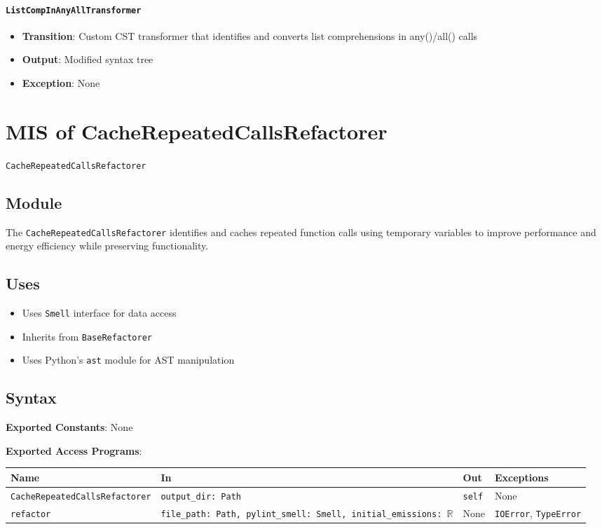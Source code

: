 \documentclass[12pt, titlepage]{article}
\begin{document}
\paragraph{\texttt{ListCompInAnyAllTransformer}}
\begin{itemize}
\item \textbf{Transition}: Custom CST transformer that identifies and converts list comprehensions in any()/all() calls
\item \textbf{Output}: Modified syntax tree
\item \textbf{Exception}: None
\end{itemize}

\newpage

\section{MIS of CacheRepeatedCallsRefactorer} \label{mis:CacheCalls}

\texttt{CacheRepeatedCallsRefactorer}

\subsection{Module}
The \texttt{CacheRepeatedCallsRefactorer} identifies and caches repeated function calls using temporary variables to improve performance and energy efficiency while preserving functionality.

\subsection{Uses}
\begin{itemize}
\item Uses \texttt{Smell} interface for data access
\item Inherits from \texttt{BaseRefactorer}
\item Uses Python's \texttt{ast} module for AST manipulation
\end{itemize}

\subsection{Syntax}
\noindent
\textbf{Exported Constants}: None

\noindent
\textbf{Exported Access Programs}:\\
\begin{tabularx}{\linewidth}{|l|>{\raggedright\arraybackslash}X|l|l|}
  \hline
  \textbf{Name} & \textbf{In} & \textbf{Out} & \textbf{Exceptions} \\\hline
  \texttt{CacheRepeatedCallsRefactorer} & \texttt{output\_dir: Path} & \texttt{self} & None \\
  \hline
  \texttt{refactor} & \texttt{file\_path: Path, pylint\_smell: Smell, initial\_emissions: $\mathbb{R}$} & None & \texttt{IOError}, \texttt{TypeError} \\
  \hline
\end{tabularx}
\end{document}
